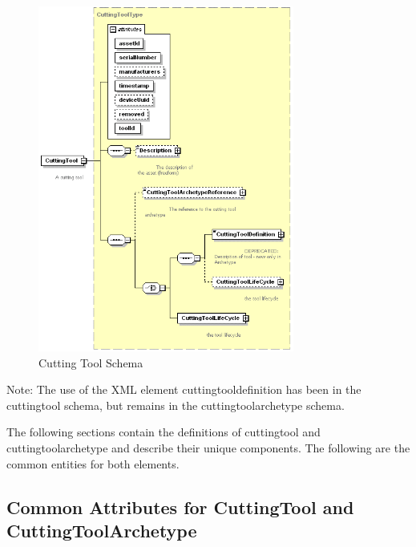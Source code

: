 \documentclass{mtconnect}	%
\begin{document}
\begin{figure}[ht]
  \centering
  \includegraphics[width=0.75\textwidth]{figures/cuttingtool-schema.png}
  \caption{Cutting Tool Schema}
  \label{fig:cuttingtool-schema}
\end{figure}

\FloatBarrier

\begin{note}
Note: The use of the XML element \gls{cuttingtooldefinition} has been \DEPRECATED in the \gls{cuttingtool} schema, but remains in the \gls{cuttingtoolarchetype} schema.

\end{note}

The following sections contain the definitions of \gls{cuttingtool} and \gls{cuttingtoolarchetype} and describe their unique components. The following are the common entities for both elements.

\subsection{Common Attributes for CuttingTool and CuttingToolArchetype}
\label{sec:Common Attributes for CuttingTool and CuttingToolArchetype}
\end{document}
